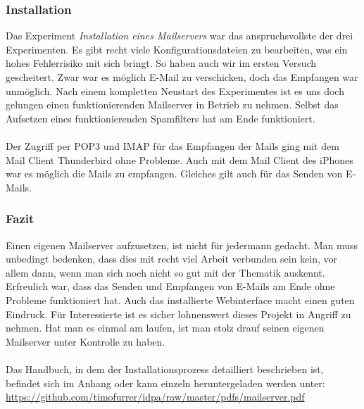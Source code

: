 \subsubsection{Installation}
Das Experiment \textit{Installation eines Mailservers} war das anspruchsvollste der drei Experimenten. Es gibt recht viele Konfigurationsdateien zu bearbeiten, was ein hohes Fehlerrisiko mit sich bringt.
So haben auch wir im ersten Versuch gescheitert. Zwar war es möglich E-Mail zu verschicken, doch das Empfangen war unmöglich.
Nach einem kompletten Neustart des Experimentes ist es uns doch gelungen einen funktionierenden Mailserver in Betrieb zu nehmen.
Selbst das Aufsetzen eines funktionierenden Spamfilters hat am Ende funktioniert. \\ \\
Der Zugriff per POP3 und IMAP für das Empfangen der Mails ging mit dem Mail Client Thunderbird ohne Probleme. Auch mit dem Mail Client des iPhones war es möglich die Mails zu empfangen. Gleiches gilt auch für das Senden von E-Mails.

\subsubsection{Fazit}
Einen eigenen Mailserver aufzusetzen, ist nicht für jedermann gedacht. Man muss unbedingt bedenken, dass dies mit recht viel Arbeit verbunden sein kein, vor allem dann, wenn man sich noch nicht so gut mit der Thematik auskennt.
Erfreulich war, dass das Senden und Empfangen von E-Mails am Ende ohne Probleme funktioniert hat. Auch das installierte Webinterface macht einen guten Eindruck.
Für Interessierte ist es sicher lohnenswert dieses Projekt in Angriff zu nehmen. Hat man es einmal am laufen, ist man stolz drauf seinen eigenen Mailserver unter Kontrolle zu haben.
\\ \\
Das Handbuch, in dem der Installationsprozess detailliert beschrieben ist, befindet sich im Anhang oder kann einzeln heruntergeladen werden unter: \url{https://github.com/timofurrer/idpa/raw/master/pdfs/mailserver.pdf}

